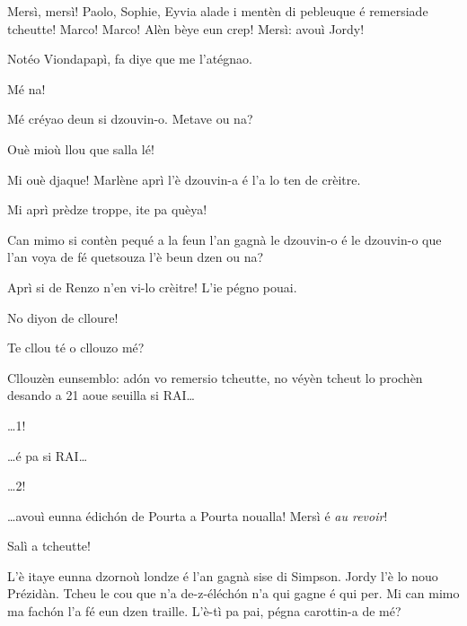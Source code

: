 \begin{drama}
\Jordyspeaks Mersì, mersì! Paolo, Sophie, Eyvia alade i mentèn di pebleuque é remersiade tcheutte! Marco! Marco! Alèn bèye eun crep! Mersì: avouì Jordy!

\ridocliou


\Brunospeaks Notéo Viondapapì, fa diye que me l'atégnao.

\Noteospeaks Mé na!

\Brunospeaks Mé créyao deun si dzouvin-o. Metave ou na?

\Noteospeaks Ouè mioù llou que salla lé!

\Brunospeaks Mi ouè djaque! Marlène aprì l'è dzouvin-a é l'a lo ten de crèitre.

\Noteospeaks Mi aprì prèdze troppe, ite pa quèya!

\Brunospeaks Can mimo si contèn pequé a la feun l'an gagnà le dzouvin-o é le dzouvin-o que l'an voya de fé quetsouza l'è beun dzen ou na?

\Noteospeaks  Aprì si de Renzo n'en vi-lo crèitre! L'ie pégno pouai.

\Brunospeaks No diyon de clloure!

\Noteospeaks  Te cllou té o cllouzo mé?

\Brunospeaks  Cllouzèn eunsemblo: ad\'on vo remersio tcheutte, no véyèn tcheut lo prochèn desando a 21 aoue seuilla si RAI\ldots

\Noteospeaks \ldots 1!

\Brunospeaks  \ldots é pa si RAI\ldots
 
\Noteospeaks \ldots 2!
 
\Brunospeaks \ldots avouì eunna édich\'on de Pourta a Pourta noualla! Mersì é \textit{au revoir}!
 
\Noteospeaks Salì a tcheutte!
 


\ridoiver


\Presidanspeaks {} L'è itaye eunna dzornoù londze é l'an gagnà sise di Simpson. Jordy l’è lo nouo Prézidàn. Tcheu le cou que n’a de-z-éléch\'on n’a qui gagne é qui per. Mi can mimo ma fach\'on l’a fé eun dzen traille. L'è-tì pa pai, pégna carottin-a \carota de mé?


\end{drama}

